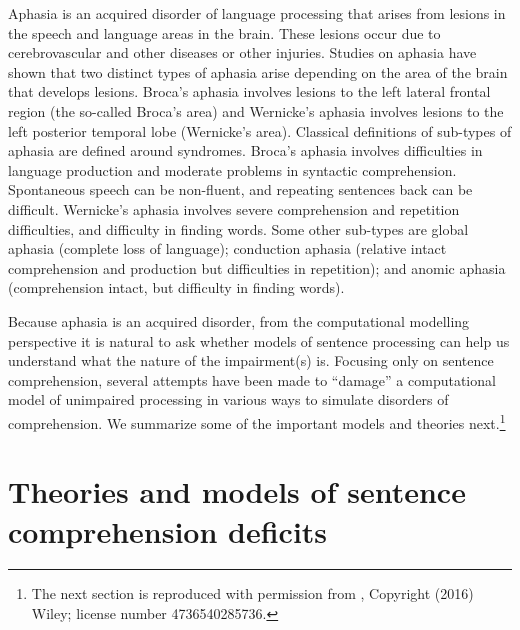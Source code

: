 \documentclass{cambridge7A}\usepackage[]{graphicx}\usepackage[]{color}
\begin{document}
Aphasia is an acquired disorder of language processing that arises from lesions in the speech and language areas in the brain. These lesions occur due to cerebrovascular and other  diseases or  other injuries. Studies on aphasia have shown that two distinct types of aphasia arise depending on the area of the brain that develops lesions. Broca's aphasia involves lesions to the left lateral frontal region (the so-called Broca's area) and Wernicke's aphasia involves lesions to the left posterior temporal lobe (Wernicke's area). Classical definitions of sub-types of aphasia are defined around syndromes.
Broca's aphasia involves difficulties in language production and moderate problems in syntactic comprehension. Spontaneous speech can be non-fluent, and  repeating sentences back can be difficult. 
Wernicke's aphasia involves severe comprehension and repetition difficulties, and difficulty in finding words. 
Some other sub-types are global aphasia (complete loss of language); conduction aphasia (relative intact comprehension and production but difficulties in repetition); and anomic aphasia (comprehension intact, but difficulty in finding words).

Because aphasia is an acquired disorder, from the computational modelling perspective it is natural to ask whether models of sentence processing can help us understand what the nature of the impairment(s) is.
Focusing only on sentence comprehension, several attempts have been made to ``damage'' a computational model of unimpaired processing in various ways to simulate disorders of comprehension. We summarize some of the important models and theories next.\footnote{The next section is reproduced with permission from \cite{PatilEtAl2016}, Copyright (2016) Wiley; license number 4736540285736.}

\section{Theories and models of sentence comprehension deficits} \label{alternativeexplanations}
\end{document}

